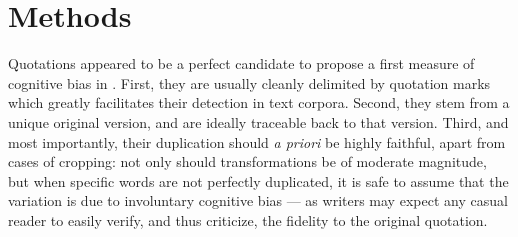 \section{Methods} %
\label{sec:protocol}



Quotations appeared to be a perfect candidate to propose a first measure of  cognitive bias in .
First, they are usually cleanly delimited by quotation marks which greatly facilitates their detection in text corpora.
Second, they stem from a unique original version, and are ideally traceable back to that version.
Third, and most importantly, their duplication should \emph{a priori} be highly faithful, apart from cases of cropping:
not only should transformations be of moderate magnitude, but when specific words are not perfectly duplicated, it is safe to assume that the variation is due to involuntary cognitive bias --- as writers may expect any casual reader to easily verify, and thus criticize, the fidelity to the original quotation.

